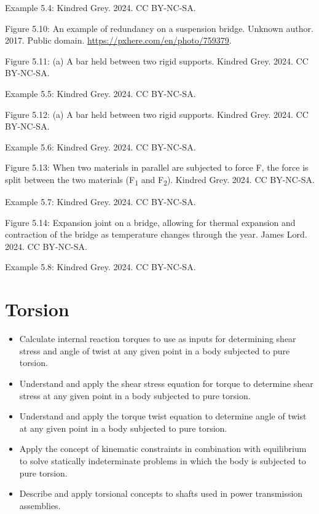 \documentclass[
  letterpaper,
  DIV=11,
  numbers=noendperiod]{scrreprt}
\providecommand{\tightlist}{%
  \setlength{\itemsep}{0pt}\setlength{\parskip}{0pt}}\usepackage{longtable,booktabs,array}
\theoremstyle{definition}
\theoremstyle{remark}
\begin{document}
Example 5.4: Kindred Grey. 2024. CC BY-NC-SA.

Figure 5.10: An example of redundancy on a suspension bridge. Unknown
author. 2017. Public domain. \url{https://pxhere.com/en/photo/759379}.

Figure 5.11: (a) A bar held between two rigid supports. Kindred Grey.
2024. CC BY-NC-SA.

Example 5.5: Kindred Grey. 2024. CC BY-NC-SA.

Figure 5.12: (a) A bar held between two rigid supports. Kindred Grey.
2024. CC BY-NC-SA.

Example 5.6: Kindred Grey. 2024. CC BY-NC-SA.

Figure 5.13: When two materials in parallel are subjected to force F,
the force is split between the two materials (F\textsubscript{1} and
F\textsubscript{2}). Kindred Grey. 2024. CC BY-NC-SA.

Example 5.7: Kindred Grey. 2024. CC BY-NC-SA.

Figure 5.14: Expansion joint on a bridge, allowing for thermal expansion
and contraction of the bridge as temperature changes through the year.
James Lord. 2024. CC BY-NC-SA.

Example 5.8: Kindred Grey. 2024. CC BY-NC-SA.


\chapter{Torsion}\label{sec-torsional-loading}

\begin{tcolorbox}[enhanced jigsaw, leftrule=.75mm, bottomrule=.15mm, opacityback=0, opacitybacktitle=0.6, colframe=quarto-callout-note-color-frame, toprule=.15mm, colbacktitle=quarto-callout-note-color!10!white, coltitle=black, bottomtitle=1mm, title={Learning Objectives}, titlerule=0mm, toptitle=1mm, colback=white, rightrule=.15mm, left=2mm, arc=.35mm, breakable]

\begin{itemize}
\tightlist
\item
  Calculate internal reaction torques to use as inputs for determining
  shear stress and angle of twist at any given point in a body subjected
  to pure torsion.
\item
  Understand and apply the shear stress equation for torque to determine
  shear stress at any given point in a body subjected to pure torsion.
\item
  Understand and apply the torque twist equation to determine angle of
  twist at any given point in a body subjected to pure torsion.
\item
  Apply the concept of kinematic constraints in combination with
  equilibrium to solve statically indeterminate problems in which the
  body is subjected to pure torsion.
\item
  Describe and apply torsional concepts to shafts used in power
  transmission assemblies.
\end{itemize}

\end{tcolorbox}
\end{document}
